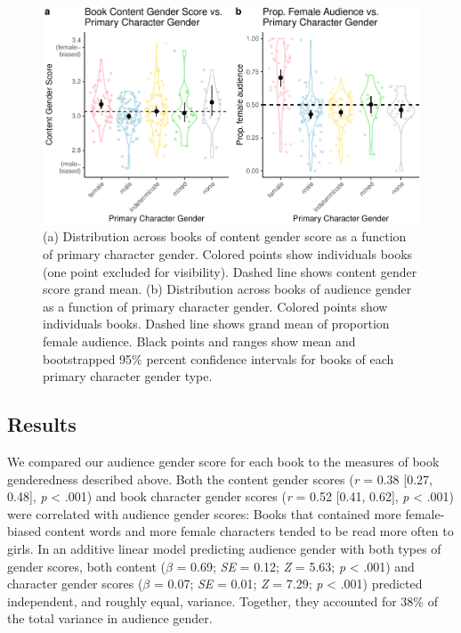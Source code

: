 \documentclass[english,,man,floatsintext]{apa6}
\begin{document}
\begin{figure}[t!]
\includegraphics[width=\textwidth,]{kidbookgender_files/figure-latex/characterplots-1} \caption{(a) Distribution across books of content gender score as a function of primary character gender. Colored points show individuals books (one point excluded for visibility). Dashed line shows content gender score grand mean. (b) Distribution across books of audience gender as a function of primary character gender. Colored points show individuals books. Dashed line shows grand mean of proportion female audience. Black points and ranges show mean and bootstrapped 95\% percent confidence intervals for books of each primary character gender type.}\label{fig:characterplots}
\end{figure}

\hypertarget{results-1}{%
\subsection{Results}\label{results-1}}

We compared our audience gender score for each book to the measures of book genderedness described above. Both the content gender scores (\emph{r} = 0.38 {[}0.27, 0.48{]}, \emph{p} \textless{} .001) and book character gender scores (\emph{r} = 0.52 {[}0.41, 0.62{]}, \emph{p} \textless{} .001) were correlated with audience gender scores: Books that contained more female-biased content words and more female characters tended to be read more often to girls. In an additive linear model predicting audience gender with both types of gender scores, both content (\(\beta\) = 0.69; \emph{SE} = 0.12; \emph{Z} = 5.63; \emph{p} \textless{} .001) and character gender scores (\(\beta\) = 0.07; \emph{SE} = 0.01; \emph{Z} = 7.29; \emph{p} \textless{} .001) predicted independent, and roughly equal, variance. Together, they accounted for 38\% of the total variance in audience gender.
\end{document}
